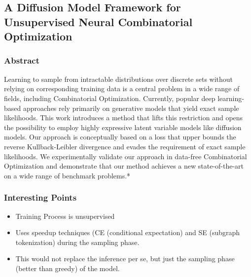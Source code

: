\subsection{A Diffusion Model Framework for Unsupervised Neural
Combinatorial Optimization}
\subsubsection{Abstract}
Learning to sample from intractable distributions
over discrete sets without relying on corresponding training data is a central problem in a wide
range of fields, including Combinatorial Optimization. Currently, popular deep learning-based
approaches rely primarily on generative models
that yield exact sample likelihoods. This work
introduces a method that lifts this restriction and
opens the possibility to employ highly expressive latent variable models like diffusion models.
Our approach is conceptually based on a loss that
upper bounds the reverse Kullback-Leibler divergence and evades the requirement of exact sample
likelihoods. We experimentally validate our approach in data-free Combinatorial Optimization
and demonstrate that our method achieves a new
state-of-the-art on a wide range of benchmark
problems.*
\subsubsection{Interesting Points}
\begin{itemize}
    \item Training Process is unsupervised
    \item Uses speedup techniques (CE (conditional expectation) and SE (subgraph tokenization) during the sampling phase.
    \item This would not replace the inference per se, but just the sampling phase (better than greedy) of the model.
\end{itemize}